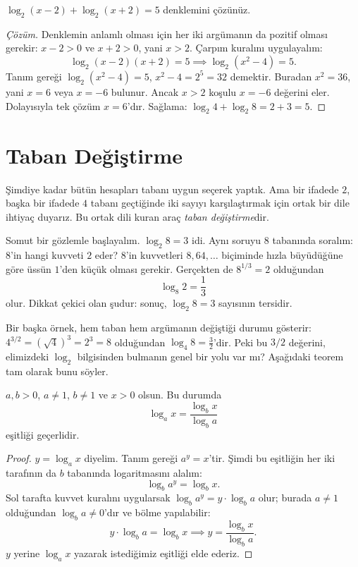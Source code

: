 \begin{example}
$\log_2(x - 2) + \log_2(x + 2) = 5$ denklemini çözünüz.
\end{example}

\begin{proof}[Çözüm]
Denklemin anlamlı olması için her iki argümanın da pozitif olması gerekir: $x - 2 > 0$ ve $x + 2 > 0$, yani $x > 2$. Çarpım kuralını uygulayalım:
\[
\log_2 (x - 2)(x + 2) = 5 \implies \log_2 (x^2 - 4) = 5.
\]
Tanım gereği $\log_2 (x^2 - 4) = 5$, $x^2 - 4 = 2^5 = 32$ demektir. Buradan $x^2 = 36$, yani $x = 6$ veya $x = -6$ bulunur. Ancak $x > 2$ koşulu $x = -6$ değerini eler. Dolayısıyla tek çözüm $x = 6$'dır. Sağlama: $\log_2 4 + \log_2 8 = 2 + 3 = 5$.
\end{proof}

\section{Taban Değiştirme}

Şimdiye kadar bütün hesapları tabanı uygun seçerek yaptık. Ama bir ifadede $2$, başka bir ifadede $4$ tabanı geçtiğinde iki sayıyı karşılaştırmak için ortak bir dile ihtiyaç duyarız. Bu ortak dili kuran araç \emph{taban değiştirme}dir.

Somut bir gözlemle başlayalım. $\log_2 8 = 3$ idi. Aynı soruyu $8$ tabanında soralım: $8$'in hangi kuvveti $2$ eder? $8$'in kuvvetleri $8, 64, \dots$ biçiminde hızla büyüdüğüne göre üssün $1$'den küçük olması gerekir. Gerçekten de $8^{1/3} = 2$ olduğundan
\[
\log_8 2 = \frac{1}{3}
\]
olur. Dikkat çekici olan şudur: sonuç, $\log_2 8 = 3$ sayısının tersidir.

Bir başka örnek, hem taban hem argümanın değiştiği durumu gösterir: $4^{3/2} = (\sqrt{4})^3 = 2^3 = 8$ olduğundan $\log_4 8 = \frac{3}{2}$'dir. Peki bu $3/2$ değerini, elimizdeki $\log_2$ bilgisinden bulmanın genel bir yolu var mı? Aşağıdaki teorem tam olarak bunu söyler.

\begin{theorem}\label{thm:log-taban}
$a, b > 0$, $a \neq 1$, $b \neq 1$ ve $x > 0$ olsun. Bu durumda
\[
\log_a x = \frac{\log_b x}{\log_b a}
\]
eşitliği geçerlidir.
\end{theorem}

\begin{proof}
$y = \log_a x$ diyelim. Tanım gereği $a^y = x$'tir. Şimdi bu eşitliğin her iki tarafının da $b$ tabanında logaritmasını alalım:
\[
\log_b a^y = \log_b x.
\]
Sol tarafta kuvvet kuralını uygularsak $\log_b a^y = y \cdot \log_b a$ olur; burada $a \neq 1$ olduğundan $\log_b a \neq 0$'dır ve bölme yapılabilir:
\[
y \cdot \log_b a = \log_b x \implies y = \frac{\log_b x}{\log_b a}.
\]
$y$ yerine $\log_a x$ yazarak istediğimiz eşitliği elde ederiz.
\end{proof}

